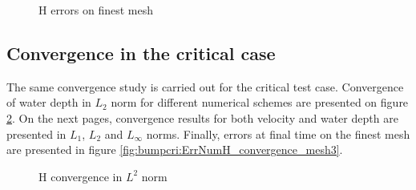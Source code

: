 \begin{figure}[H]
\centering
  \caption{H errors on finest mesh}
\label{fig:bump:ErrNumH_convergence_mesh3}
\end{figure}


\subsection{Convergence in the critical case}

The same convergence study is carried out for the critical test case.
Convergence of water depth in $L_2$ norm for different numerical schemes are presented on figure \ref{fig:bumpcri:ErrNumH_convergence}. On the next pages, convergence results for both velocity and water depth 
are presented in $L_1$, $L_2$ and $L_{\infty}$ norms. Finally, errors at final time on the finest mesh are presented in figure \ref{fig:bumpcri:ErrNumH_convergence_mesh3}.

\begin{figure}[H]
\centering
  \caption{H convergence in $L^2$ norm}
\label{fig:bumpcri:ErrNumH_convergence}
\end{figure}

